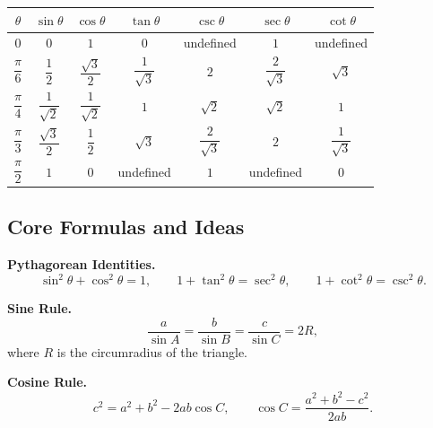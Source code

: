 \documentclass[12pt]{article}
\begin{document}
\begin{center}
\renewcommand{\arraystretch}{1.7}
\setlength{\tabcolsep}{10pt}
\begin{tabular}{|c|c|c|c|c|c|c|}
\hline
$\theta$ & $\sin\theta$ & $\cos\theta$ & $\tan\theta$
& $\csc\theta$ & $\sec\theta$ & $\cot\theta$ \\
\hline
$0$ & $0$ & $1$ & $0$ & undefined & $1$ & undefined \\
\hline
$\dfrac{\pi}{6}$ & $\dfrac12$ & $\dfrac{\sqrt3}{2}$ & $\dfrac1{\sqrt3}$
& $2$ & $\dfrac2{\sqrt3}$ & $\sqrt3$ \\
\hline
$\dfrac{\pi}{4}$ & $\dfrac1{\sqrt2}$ & $\dfrac1{\sqrt2}$ & $1$
& $\sqrt2$ & $\sqrt2$ & $1$ \\
\hline
$\dfrac{\pi}{3}$ & $\dfrac{\sqrt3}{2}$ & $\dfrac12$ & $\sqrt3$
& $\dfrac2{\sqrt3}$ & $2$ & $\dfrac1{\sqrt3}$ \\
\hline
$\dfrac{\pi}{2}$ & $1$ & $0$ & undefined & $1$ & undefined & $0$ \\
\hline
\end{tabular}
\end{center}

\subsection{Core Formulas and Ideas}


\textbf{Pythagorean Identities.}
\[
\sin^2\theta + \cos^2\theta = 1, \qquad
1 + \tan^2\theta = \sec^2\theta, \qquad
1 + \cot^2\theta = \csc^2\theta.
\]

\textbf{Sine Rule.}
\[
\frac{a}{\sin A} = \frac{b}{\sin B} = \frac{c}{\sin C} = 2R,
\]
where $R$ is the circumradius of the triangle.

\textbf{Cosine Rule.}
\[
c^2 = a^2 + b^2 - 2ab\cos C, \qquad
\cos C = \frac{a^2+b^2-c^2}{2ab}.
\]
\end{document}
